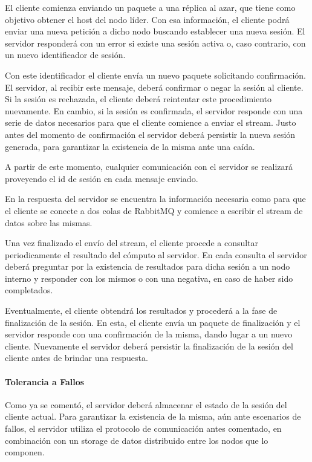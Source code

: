 \documentclass[titlepage,a4paper,oneside]{article}
\begin{document}
El cliente comienza enviando un paquete a una réplica al azar, que tiene como objetivo obtener el host del nodo líder. Con esa información, el cliente podrá enviar una nueva petición a dicho nodo buscando establecer una nueva sesión. El servidor responderá con un error si existe una sesión activa o, caso contrario, con un nuevo identificador de sesión.

Con este identificador el cliente envía un nuevo paquete solicitando confirmación. El servidor, al recibir este mensaje, deberá confirmar o negar la sesión al cliente. Si la sesión es rechazada, el cliente deberá reintentar este procedimiento nuevamente. En cambio, si la sesión es confirmada, el servidor responde con una serie de datos necesarios para que el cliente comience a enviar el stream. Justo antes del momento de confirmación el servidor deberá persistir la nueva sesión generada, para garantizar la existencia de la misma ante una caída.

A partir de este momento, cualquier comunicación con el servidor se realizará proveyendo el id de sesión en cada mensaje enviado.

En la respuesta del servidor se encuentra la información necesaria como para que el cliente se conecte a dos colas de RabbitMQ y comience a escribir el stream de datos sobre las mismas.

Una vez finalizado el envío del stream, el cliente procede a consultar periodicamente el resultado del cómputo al servidor. En cada consulta el servidor deberá preguntar por la existencia de resultados para dicha sesión a un nodo interno y responder con los mismos o con una negativa, en caso de haber sido completados.

Eventualmente, el cliente obtendrá los resultados y procederá a la fase de finalización de la sesión. En esta, el cliente envía un paquete de finalización y el servidor responde con una confirmación de la misma, dando lugar a un nuevo cliente. Nuevamente el servidor deberá persistir la finalización de la sesión del cliente antes de brindar una respuesta.

\paragraph{Tolerancia a Fallos}

Como ya se comentó, el servidor deberá almacenar el estado de la sesión del cliente actual. Para garantizar la existencia de la misma, aún ante escenarios de fallos, el servidor utiliza el protocolo de comunicación antes comentado, en combinación con un storage de datos distribuido entre los nodos que lo componen.
\end{document}
